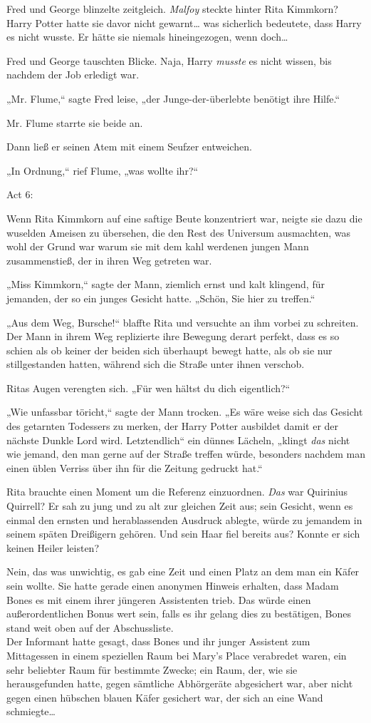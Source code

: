 {Fred und George blinzelte zeitgleich. \emph{Malfoy} steckte hinter Rita Kimmkorn? Harry Potter hatte sie davor nicht gewarnt… was sicherlich bedeutete, dass Harry es nicht wusste. Er hätte sie niemals hineingezogen, wenn doch…

Fred und George tauschten Blicke. Naja, Harry \emph{musste} es nicht wissen, bis nachdem der Job erledigt war.

„Mr. Flume,“ sagte Fred leise, „der Junge-der-überlebte benötigt ihre Hilfe.“

Mr. Flume starrte sie beide an.

Dann ließ er seinen Atem mit einem Seufzer entweichen.

„In Ordnung,“ rief Flume, „was wollte ihr?“

Act 6:

Wenn Rita Kimmkorn auf eine saftige Beute konzentriert war, neigte sie dazu die wuselden Ameisen zu übersehen, die den Rest des Universum ausmachten, was wohl der Grund war warum sie mit dem kahl werdenen jungen Mann zusammenstieß, der in ihren Weg getreten war.

„Miss Kimmkorn,“ sagte der Mann, ziemlich ernst und kalt klingend, für jemanden, der so ein junges Gesicht hatte. „Schön, Sie hier zu treffen.“

„Aus dem Weg, Bursche!“ blaffte Rita und versuchte an ihm vorbei zu schreiten. Der Mann in ihrem Weg replizierte ihre Bewegung derart perfekt, dass es so schien als ob keiner der beiden sich überhaupt bewegt hatte, als ob sie nur stillgestanden hatten, während sich die Straße unter ihnen verschob.

Ritas Augen verengten sich. „Für wen hältst du dich eigentlich?“

„Wie unfassbar töricht,“ sagte der Mann trocken. „Es wäre weise sich das Gesicht des getarnten Todessers zu merken, der Harry Potter ausbildet damit er der nächste Dunkle Lord wird. Letztendlich“ ein dünnes Lächeln, „klingt \emph{das} nicht wie jemand, den man gerne auf der Straße treffen würde, besonders nachdem man einen üblen Verriss über ihn für die Zeitung gedruckt hat.“

Rita brauchte einen Moment um die Referenz einzuordnen. \emph{Das} war Quirinius Quirrell? Er sah zu jung und zu alt zur gleichen Zeit aus; sein Gesicht, wenn es einmal den ernsten und herablassenden Ausdruck ablegte, würde zu jemandem in seinem späten Dreißigern gehören. Und sein Haar fiel bereits aus? Konnte er sich keinen Heiler leisten?

Nein, das was unwichtig, es gab eine Zeit und einen Platz an dem man ein Käfer sein wollte. Sie hatte gerade einen anonymen Hinweis erhalten, dass Madam Bones es mit einem ihrer jüngeren Assistenten trieb. Das würde einen außerordentlichen Bonus wert sein, falls es ihr gelang dies zu bestätigen, Bones stand weit oben auf der Abschussliste.\\ Der Informant hatte gesagt, dass Bones und ihr junger Assistent zum Mittagessen in einem speziellen Raum bei Mary's Place verabredet waren, ein sehr beliebter Raum für bestimmte Zwecke; ein Raum, der, wie sie herausgefunden hatte, gegen sämtliche Abhörgeräte abgesichert war, aber nicht gegen einen hübschen blauen Käfer gesichert war, der sich an eine Wand schmiegte…

}

